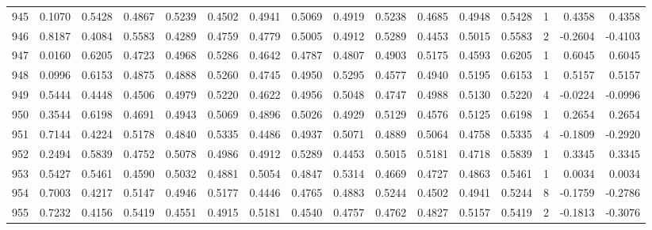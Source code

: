 \begin{tabular}{lrrrrrrrrrrrrrrr}
945 &      0.1070 &  0.5428 &  0.4867 &  0.5239 &  0.4502 &  0.4941 &  0.5069 &  0.4919 &  0.5238 &  0.4685 &   0.4948 &     0.5428 &      1 &                    0.4358 &                     0.4358 \\
946 &      0.8187 &  0.4084 &  0.5583 &  0.4289 &  0.4759 &  0.4779 &  0.5005 &  0.4912 &  0.5289 &  0.4453 &   0.5015 &     0.5583 &      2 &                   -0.2604 &                    -0.4103 \\
947 &      0.0160 &  0.6205 &  0.4723 &  0.4968 &  0.5286 &  0.4642 &  0.4787 &  0.4807 &  0.4903 &  0.5175 &   0.4593 &     0.6205 &      1 &                    0.6045 &                     0.6045 \\
948 &      0.0996 &  0.6153 &  0.4875 &  0.4888 &  0.5260 &  0.4745 &  0.4950 &  0.5295 &  0.4577 &  0.4940 &   0.5195 &     0.6153 &      1 &                    0.5157 &                     0.5157 \\
949 &      0.5444 &  0.4448 &  0.4506 &  0.4979 &  0.5220 &  0.4622 &  0.4956 &  0.5048 &  0.4747 &  0.4988 &   0.5130 &     0.5220 &      4 &                   -0.0224 &                    -0.0996 \\
950 &      0.3544 &  0.6198 &  0.4691 &  0.4943 &  0.5069 &  0.4896 &  0.5026 &  0.4929 &  0.5129 &  0.4576 &   0.5125 &     0.6198 &      1 &                    0.2654 &                     0.2654 \\
951 &      0.7144 &  0.4224 &  0.5178 &  0.4840 &  0.5335 &  0.4486 &  0.4937 &  0.5071 &  0.4889 &  0.5064 &   0.4758 &     0.5335 &      4 &                   -0.1809 &                    -0.2920 \\
952 &      0.2494 &  0.5839 &  0.4752 &  0.5078 &  0.4986 &  0.4912 &  0.5289 &  0.4453 &  0.5015 &  0.5181 &   0.4718 &     0.5839 &      1 &                    0.3345 &                     0.3345 \\
953 &      0.5427 &  0.5461 &  0.4590 &  0.5032 &  0.4881 &  0.5054 &  0.4847 &  0.5314 &  0.4669 &  0.4727 &   0.4863 &     0.5461 &      1 &                    0.0034 &                     0.0034 \\
954 &      0.7003 &  0.4217 &  0.5147 &  0.4946 &  0.5177 &  0.4446 &  0.4765 &  0.4883 &  0.5244 &  0.4502 &   0.4941 &     0.5244 &      8 &                   -0.1759 &                    -0.2786 \\
955 &      0.7232 &  0.4156 &  0.5419 &  0.4551 &  0.4915 &  0.5181 &  0.4540 &  0.4757 &  0.4762 &  0.4827 &   0.5157 &     0.5419 &      2 &                   -0.1813 &                    -0.3076 \\

\end{tabular}
